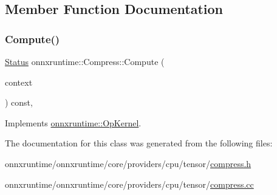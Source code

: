 \subsection{Member Function Documentation}
\mbox{\label{classonnxruntime_1_1Compress_a3fb89293bd5c713c2ec5b76a19d2c183}} 
\subsubsection{\texorpdfstring{Compute()}{Compute()}}
{\footnotesize\ttfamily \mbox{\hyperlink{classonnxruntime_1_1common_1_1Status}{Status}} onnxruntime\+::\+Compress\+::\+Compute (\begin{DoxyParamCaption}\item[{\mbox{\hyperlink{classonnxruntime_1_1OpKernelContext}{Op\+Kernel\+Context}} $\ast$}]{context }\end{DoxyParamCaption}) const\hspace{0.3cm}{\ttfamily [override]}, {\ttfamily [virtual]}}



Implements \mbox{\hyperlink{classonnxruntime_1_1OpKernel_a9eca8656a78b1b3ab9d3351a12798650}{onnxruntime\+::\+Op\+Kernel}}.



The documentation for this class was generated from the following files\+:\begin{DoxyCompactItemize}
\item 
onnxruntime/onnxruntime/core/providers/cpu/tensor/\mbox{\hyperlink{compress_8h}{compress.\+h}}\item 
onnxruntime/onnxruntime/core/providers/cpu/tensor/\mbox{\hyperlink{compress_8cc}{compress.\+cc}}\end{DoxyCompactItemize}
